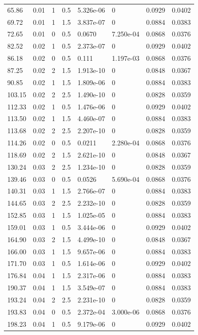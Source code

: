 \documentclass[preview]{standalone}
\begin{document}
{{\begin{tabular}{L{1.2cm}C{1.2cm} C{0.3cm}C{0.5cm} C{1.4cm}C{1.4cm} C{1.4cm}C{1.4cm}}
  65.86  &  0.01  & 1     & 0.5 &  5.326e-06  & 0  & 0.0929 &  0.0402   \\ 
  69.72  &  0.01  & 1     & 1.5 &  3.837e-07  & 0  & 0.0884 &  0.0383   \\ 
  72.65  &  0.01  & 0     & 0.5 &  0.0670  & 7.250e-04  & 0.0868 &  0.0376   \\ 
  82.52  &  0.02  & 1     & 0.5 &  2.373e-07  & 0  & 0.0929 &  0.0402   \\ 
  86.18  &  0.02  & 0     & 0.5 &  0.111  & 1.197e-03  & 0.0868 &  0.0376   \\ 
  87.25  &  0.02  & 2     & 1.5 &  1.913e-10  & 0  & 0.0848 &  0.0367   \\ 
  90.85  &  0.02  & 1     & 1.5 &  1.809e-06  & 0  & 0.0884 &  0.0383   \\ 
  103.15  &  0.02  & 2     & 2.5 &  1.490e-10  & 0  & 0.0828 &  0.0359   \\ 
  112.33  &  0.02  & 1     & 0.5 &  1.476e-06  & 0  & 0.0929 &  0.0402   \\ 
  113.50  &  0.02  & 1     & 1.5 &  4.460e-07  & 0  & 0.0884 &  0.0383   \\ 
  113.68  &  0.02  & 2     & 2.5 &  2.207e-10  & 0  & 0.0828 &  0.0359   \\ 
  114.26  &  0.02  & 0     & 0.5 &  0.0211  & 2.280e-04  & 0.0868 &  0.0376   \\ 
  118.69  &  0.02  & 2     & 1.5 &  2.621e-10  & 0  & 0.0848 &  0.0367   \\ 
  130.24  &  0.03  & 2     & 2.5 &  1.234e-10  & 0  & 0.0828 &  0.0359   \\ 
  139.46  &  0.03  & 0     & 0.5 &  0.0526  & 5.690e-04  & 0.0868 &  0.0376   \\ 
  140.31  &  0.03  & 1     & 1.5 &  2.766e-07  & 0  & 0.0884 &  0.0383   \\ 
  144.65  &  0.03  & 2     & 2.5 &  2.232e-10  & 0  & 0.0828 &  0.0359   \\ 
  152.85  &  0.03  & 1     & 1.5 &  1.025e-05  & 0  & 0.0884 &  0.0383   \\ 
  159.01  &  0.03  & 1     & 0.5 &  3.444e-06  & 0  & 0.0929 &  0.0402   \\ 
  164.90  &  0.03  & 2     & 1.5 &  4.499e-10  & 0  & 0.0848 &  0.0367   \\ 
  166.00  &  0.03  & 1     & 1.5 &  9.657e-06  & 0  & 0.0884 &  0.0383   \\ 
  171.70  &  0.03  & 1     & 0.5 &  1.614e-06  & 0  & 0.0929 &  0.0402   \\ 
  176.84  &  0.04  & 1     & 1.5 &  2.317e-06  & 0  & 0.0884 &  0.0383   \\ 
  190.37  &  0.04  & 1     & 1.5 &  3.549e-07  & 0  & 0.0884 &  0.0383   \\ 
  193.24  &  0.04  & 2     & 2.5 &  2.231e-10  & 0  & 0.0828 &  0.0359   \\ 
  193.83  &  0.04  & 0     & 0.5 &  2.372e-04  & 3.000e-06  & 0.0868 &  0.0376   \\ 
  198.23  &  0.04  & 1     & 0.5 &  9.179e-06  & 0  & 0.0929 &  0.0402   \\ 
\hline 
\end{tabular} 

}}
\end{document}
